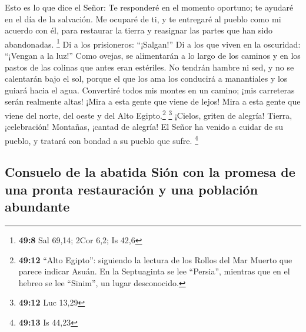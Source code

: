  Esto es lo que dice el Señor: Te responderé en el momento
oportuno; te ayudaré en el día de la salvación. Me ocuparé de ti, y te
entregaré al pueblo como mi acuerdo con él, para restaurar la tierra y
reasignar las partes que han sido abandonadas. \footnote{\textbf{49:8}
  Sal 69,14; 2Cor 6,2; Is 42,6}  Di a los prisioneros:
``¡Salgan!'' Di a los que viven en la oscuridad: ``¡Vengan a la luz!''
Como ovejas, se alimentarán a lo largo de los caminos y en los pastos de
las colinas que antes eran estériles.  No tendrán hambre
ni sed, y no se calentarán bajo el sol, porque el que los ama los
conducirá a manantiales y los guiará hacia el agua. 
Convertiré todos mis montes en un camino; ¡mis carreteras serán
realmente altas!  ¡Mira a esta gente que viene de lejos!
Mira a esta gente que viene del norte, del oeste y del Alto
Egipto.\footnote{\textbf{49:12} ``Alto Egipto'': siguiendo la lectura de
  los Rollos del Mar Muerto que parece indicar Asuán. En la Septuaginta
  se lee ``Persia'', mientras que en el hebreo se lee ``Sinim'', un
  lugar desconocido.} \footnote{\textbf{49:12} Luc 13,29}
 ¡Cielos, griten de alegría! Tierra, ¡celebración!
Montañas, ¡cantad de alegría! El Señor ha venido a cuidar de su pueblo,
y tratará con bondad a su pueblo que sufre. \footnote{\textbf{49:13} Is
  44,23}

\hypertarget{consuelo-de-la-abatida-siuxf3n-con-la-promesa-de-una-pronta-restauraciuxf3n-y-una-poblaciuxf3n-abundante}{%
\subsection{Consuelo de la abatida Sión con la promesa de una pronta
restauración y una población
abundante}\label{consuelo-de-la-abatida-siuxf3n-con-la-promesa-de-una-pronta-restauraciuxf3n-y-una-poblaciuxf3n-abundante}}

